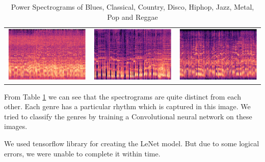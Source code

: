 \documentclass[a4paper,10pt]{article}
\begin{document}
\begin{table}[!ht]
\begin{tabular}{ccc}
        \includegraphics[scale=0.3]{metal.png} &  \includegraphics[scale=0.3]{pop.png} & \includegraphics[scale=0.3]{reggae.png}\\ 
    \end{tabular}
    \caption{Power Spectrograms of Blues, Classical, Country, Disco, Hiphop, Jazz, Metal, Pop and Reggae}
    \label{tab:spectrograms}
\end{table}

From Table \ref{tab:spectrograms} we can see that the spectrograms are quite distinct from each other. Each genre has a particular rhythm which is captured in this image. We tried to classify the genres by training a Convolutional neural network on these images.

We used tensorflow library for creating the LeNet model. But due to some logical errors, we were unable to complete it within time.
\end{document}
